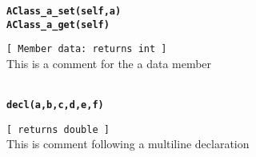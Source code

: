 {\tt \bf AClass\_a\_set(self,a)\\
AClass\_a\_get(self) }
\\
\makebox[0.5in]{}\begin{minipage}[t]{6in}
{\tt [ Member data: returns int  ]  }\\
   This is a comment for the a data member   
\\

\end{minipage}\\

{\tt \bf decl(a,b,c,d,e,f) }
\\
\makebox[0.5in]{}\begin{minipage}[t]{6in}
{\tt [ returns double  ]  }\\
   This is comment following a multiline declaration   
\\

\end{minipage}\\



